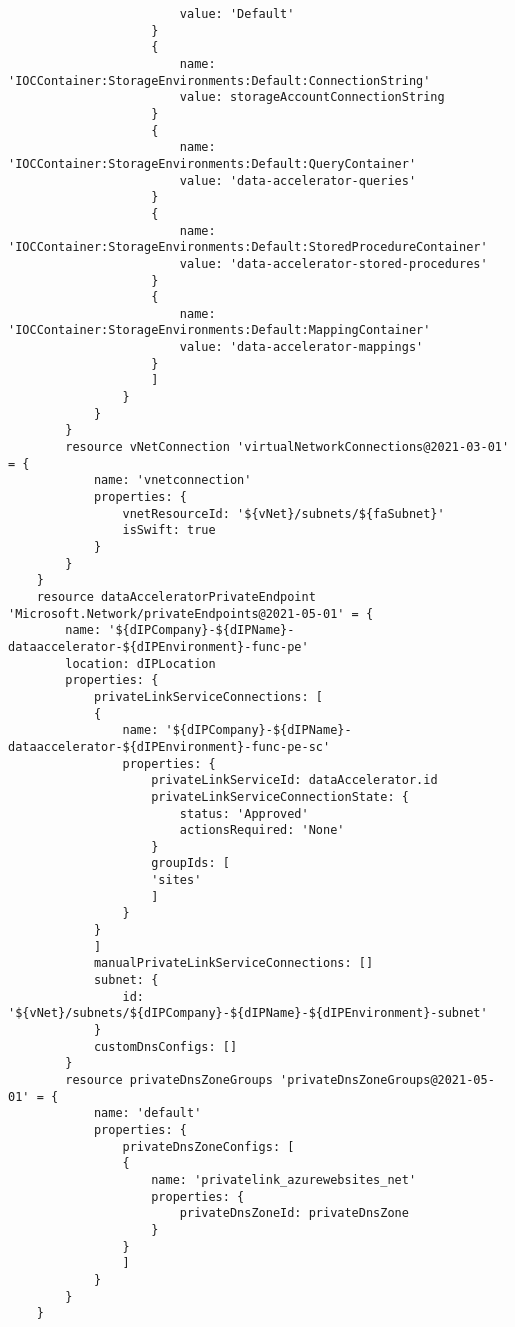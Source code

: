 \documentclass[dutch,dit,thesis]{hogentreport}
\begin{document}
\begin{lstlisting}
                        value: 'Default'
                    }
                    {
                        name: 'IOCContainer:StorageEnvironments:Default:ConnectionString'
                        value: storageAccountConnectionString
                    }
                    {
                        name: 'IOCContainer:StorageEnvironments:Default:QueryContainer'
                        value: 'data-accelerator-queries'
                    }
                    {
                        name: 'IOCContainer:StorageEnvironments:Default:StoredProcedureContainer'
                        value: 'data-accelerator-stored-procedures'
                    }
                    {
                        name: 'IOCContainer:StorageEnvironments:Default:MappingContainer'
                        value: 'data-accelerator-mappings'
                    }
                    ]
                }
            }
        }
        resource vNetConnection 'virtualNetworkConnections@2021-03-01' = {
            name: 'vnetconnection'
            properties: {
                vnetResourceId: '${vNet}/subnets/${faSubnet}'
                isSwift: true
            }
        }
    }
    resource dataAcceleratorPrivateEndpoint 'Microsoft.Network/privateEndpoints@2021-05-01' = {
        name: '${dIPCompany}-${dIPName}-dataaccelerator-${dIPEnvironment}-func-pe'
        location: dIPLocation
        properties: {
            privateLinkServiceConnections: [
            {
                name: '${dIPCompany}-${dIPName}-dataaccelerator-${dIPEnvironment}-func-pe-sc'
                properties: {
                    privateLinkServiceId: dataAccelerator.id
                    privateLinkServiceConnectionState: {
                        status: 'Approved'
                        actionsRequired: 'None'
                    }
                    groupIds: [
                    'sites'
                    ]
                }
            }
            ]
            manualPrivateLinkServiceConnections: []
            subnet: {
                id: '${vNet}/subnets/${dIPCompany}-${dIPName}-${dIPEnvironment}-subnet'
            }
            customDnsConfigs: []
        }
        resource privateDnsZoneGroups 'privateDnsZoneGroups@2021-05-01' = {
            name: 'default'
            properties: {
                privateDnsZoneConfigs: [
                {
                    name: 'privatelink_azurewebsites_net'
                    properties: {
                        privateDnsZoneId: privateDnsZone
                    }
                }
                ]
            }
        }
    }

\end{lstlisting}
\end{document}
